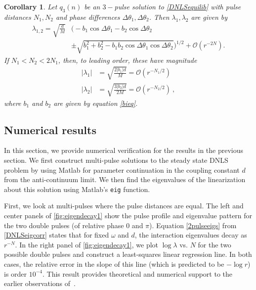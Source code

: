 \documentclass[12pt]{elsarticle}
\newtheorem{corollary}{Corollary}
\begin{document}
\begin{corollary}\label{DNLSeigcorr2}
Let $q_3(n)$ be an $3-$pulse solution to \cref{DNLSequilib} with pulse distances $N_1, N_2$ and phase differences $\Delta \theta_1, \Delta \theta_2$. Then $\lambda_1, \lambda_2$ are given by
\begin{equation}\label{3pulseeigs}
\begin{aligned}
\lambda_{1,2} = \sqrt{\frac{d}{M}}
&\Big( -b_1\cos\Delta\theta_1 - b_2\cos\Delta\theta_2  \\
&\pm \sqrt{b_1^2 + b_2^2 - b_1 b_2\cos\Delta\theta_1 \cos\Delta\theta_2} \Big)^{1/2} + \mathcal{O}(r^{-2N}).
\end{aligned}
\end{equation}
If $N_1 < N_2 < 2 N_1$, then, to leading order, these have magnitude
\begin{equation}\label{3pulsemag}
\begin{aligned}
|\lambda_1| &= \sqrt{\frac{2 |b_1| d}{M}} = \mathcal{O}(r^{-N_1/2}) \\
|\lambda_2| &= \sqrt{\frac{3 |b_2| d}{2 M}} = \mathcal{O}(r^{-N_2/2}) \:,
\end{aligned}
\end{equation}
where $b_1$ and $b_2$ are given by equation \cref{bieq}.
\end{corollary}

\subsection{Numerical results}

In this section, we provide numerical verification for the results in the previous section. We first construct multi-pulse solutions to the steady state DNLS problem by using Matlab for parameter continuation in the coupling constant $d$ from the anti-continuum limit. We then find the eigenvalues of the linearization about this solution using Matlab's \texttt{eig} function. 

First, we look at multi-pulses where the pulse distances are equal.  The left and center panels of \cref{fig:eigendecay1} show the pulse profile and eigenvalue pattern for the two double pulses (of relative
phase $0$ and $\pi$). Equation \cref{2pulseeigs} from \cref{DNLSeigcorr} states that for fixed $\omega$ and $d$, the interaction eigenvalues decay as $r^{-N}$. In the right panel of \cref{fig:eigendecay1}, we plot $\log \lambda$ vs. $N$ for the two possible double pulses and construct a least-squares linear regression line. In both cases, the relative error in the slope of this line (which is predicted to be $-\log r$) is order $10^{-4}$. This result provides theoretical and numerical support to the earlier observations of~\cite{Kapitula2001a}.
\end{document}
